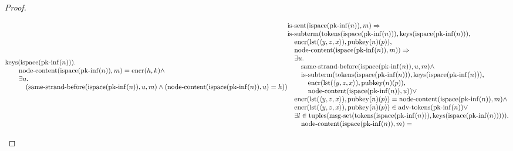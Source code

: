 \documentclass[11pt]{article}
\theoremstyle{plain}
\begin{document}
\begin{proof}
\begin{itemize}[leftmargin=2.8em, itemsep=4pt, parsep=1pt]
\begin{itemize}[leftmargin=2.8em, itemsep=4pt, parsep=1pt]
\begin{equation*}
\begin{array}{@{}l@{}}
\operatorname{keys}(\operatorname{ispace}(\operatorname{pk\text{-}inf}(n))). \\ \quad \quad \operatorname{node\text{-}content}(\operatorname{ispace}(\operatorname{pk\text{-}inf}(n)), m) = \operatorname{encr}(h, k) \wedge \\ \quad \quad \exists u. \\ \quad \quad \quad (\operatorname{same\text{-}strand\text{-}before}(\operatorname{ispace}(\operatorname{pk\text{-}inf}(n)), u, m) \wedge (\operatorname{node\text{-}content}(\operatorname{ispace}(\operatorname{pk\text{-}inf}(n)), u) = h)) \end{array} \\
\begin{array}{@{}l@{}} \operatorname{is\text{-}sent}(\operatorname{ispace}(\operatorname{pk\text{-}inf}(n)), m) \Rightarrow  \\ \operatorname{is\text{-}subterm}(\operatorname{tokens}(\operatorname{ispace}(\operatorname{pk\text{-}inf}(n))), \operatorname{keys}(\operatorname{ispace}(\operatorname{pk\text{-}inf}(n))), \\ \quad \operatorname{encr}(\operatorname{lst}(\langle y, z, x \rangle), \operatorname{pubkey}(n)(p)), \\ \quad \operatorname{node\text{-}content}(\operatorname{ispace}(\operatorname{pk\text{-}inf}(n)), m)) \Rightarrow \\ \quad \exists u. \\ \quad \quad \operatorname{same\text{-}strand\text{-}before}(\operatorname{ispace}(\operatorname{pk\text{-}inf}(n)), u, m) \wedge \\ \quad \quad \operatorname{is\text{-}subterm}(\operatorname{tokens}(\operatorname{ispace}(\operatorname{pk\text{-}inf}(n))), \operatorname{keys}(\operatorname{ispace}(\operatorname{pk\text{-}inf}(n))), \\ \quad \quad \quad \operatorname{encr}(\operatorname{lst}(\langle y, z, x \rangle), \operatorname{pubkey}(n)(p)), \\ \quad \quad \quad \operatorname{node\text{-}content}(\operatorname{ispace}(\operatorname{pk\text{-}inf}(n)), u)) \vee \\ \quad \operatorname{encr}(\operatorname{lst}(\langle y, z, x \rangle), \operatorname{pubkey}(n)(p)) = \operatorname{node\text{-}content}(\operatorname{ispace}(\operatorname{pk\text{-}inf}(n)), m) \wedge \\ \quad \operatorname{encr}(\operatorname{lst}(\langle y, z, x \rangle), \operatorname{pubkey}(n)(p)) \in \operatorname{adv\text{-}tokens}(\operatorname{pk\text{-}inf}(n)) \vee \\ \quad \exists l \in \operatorname{tuples}(\operatorname{msg\text{-}set}(\operatorname{tokens}(\operatorname{ispace}(\operatorname{pk\text{-}inf}(n))), \operatorname{keys}(\operatorname{ispace}(\operatorname{pk\text{-}inf}(n))))). \\ \quad \quad \operatorname{node\text{-}content}(\operatorname{ispace}(\operatorname{pk\text{-}inf}(n)), m) = 
\end{array}
\end{equation*}
\end{itemize}
\end{itemize}
\end{proof}
\end{document}
